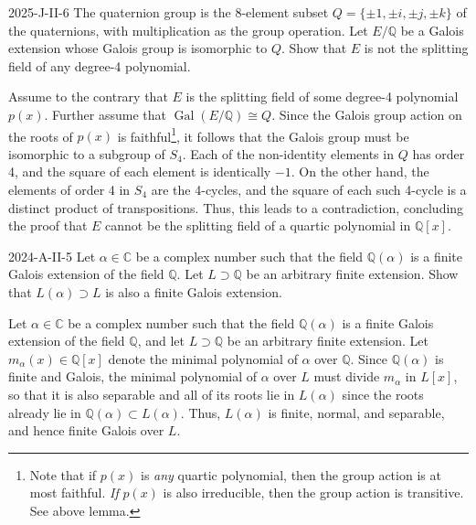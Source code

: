 \documentclass{article}
\begin{document}
	\begin{prb}{2025-J-II-6}
		The quaternion group is the 8-element subset $Q = \{\pm 1, \pm i, \pm j, \pm k\}$ of the quaternions, with multiplication as the group operation. Let $E/\mathbb{Q}$ be a Galois extension whose Galois group is isomorphic to $Q$. Show that $E$ is not the splitting field of any degree-4 polynomial. 
	\end{prb}
	Assume to the contrary that $E$ is the splitting field of some degree-4 polynomial $p(x)$. Further assume that $\operatorname{Gal}(E/\mathbb{Q}) \cong Q$. Since the Galois group action on the roots of $p(x)$ is faithful\footnote{Note that if $p(x)$ is \textit{any} quartic polynomial, then the group action is at most faithful. \textit{If} $p(x)$ is also irreducible, then the group action is transitive. See above lemma.}, it follows that the Galois group must be isomorphic to a subgroup of $S_{4}$. Each of the non-identity elements in $Q$ has order 4, and the square of each element is identically $-1$. On the other hand, the elements of order 4 in $S_{4}$ are the 4-cycles, and the square of each such 4-cycle is a distinct product of transpositions. Thus, this leads to a contradiction, concluding the proof that $E$ cannot be the splitting field of a quartic polynomial in $\mathbb{Q}[x]$. 
	
	\begin{prb}{2024-A-II-5}
		Let $\alpha \in \mathbb{C}$ be a complex number such that the field $\mathbb{Q}(\alpha)$ is a finite Galois extension of the field $\mathbb{Q}$. Let $L \supset \mathbb{Q}$ be an arbitrary finite extension. Show that $L(\alpha) \supset L$ is also a finite Galois extension. 
	\end{prb}
	Let $\alpha \in \mathbb{C}$ be a complex number such that the field $\mathbb{Q}(\alpha)$ is a finite Galois extension of the field $\mathbb{Q}$, and let $L \supset \mathbb{Q}$ be an arbitrary finite extension. Let $m_{\alpha}(x) \in \mathbb{Q}[x]$ denote the minimal polynomial of $\alpha$ over $\mathbb{Q}$. Since $\mathbb{Q}(\alpha)$ is finite and Galois, the minimal polynomial of $\alpha$ over $L$ must divide $m_\alpha$ in $L[x]$, so that it is also separable and all of its roots lie in $L(\alpha)$ since the roots already lie in $\mathbb{Q}(\alpha) \subset L(\alpha)$. Thus, $L(\alpha)$ is finite, normal, and separable, and hence finite Galois over $L$. 
	
\end{document}
